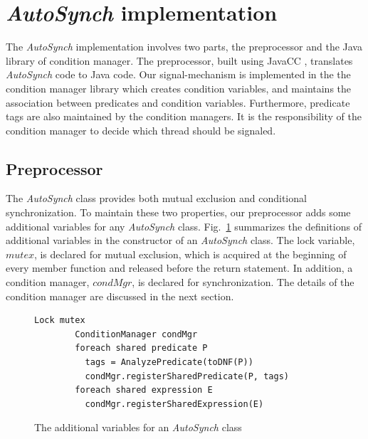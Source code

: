 \documentclass[preprint]{sigplanconf}
\begin{document}
\section{{\em AutoSynch} implementation} \label{sec:imp}
The {\em AutoSynch} implementation involves two parts, the preprocessor and the Java
library of condition manager. The preprocessor,  built using JavaCC
\cite{kod04}, translates  {\em AutoSynch} code to Java code. Our
signal-mechanism is implemented in the 
the condition manager library which creates condition variables, and maintains the association 
between predicates and condition variables. Furthermore, predicate tags are 
also maintained by the condition managers. It is the responsibility of the
condition manager to decide which thread should be signaled. 

\subsection{Preprocessor}
The {\em AutoSynch} class provides both mutual exclusion and conditional
synchronization. To maintain these two properties, our preprocessor adds some 
additional variables for any {\em AutoSynch} class. Fig.~\ref{fig:pre_cnst} 
summarizes the definitions of additional variables in the
constructor of an {\em AutoSynch} class. The lock 
variable, $mutex$, is declared for mutual exclusion, which is acquired at the 
beginning of every member function and released before the return statement.
In addition, a condition manager, $condMgr$, is declared for synchronization. 
The details of the condition manager are discussed in the next
section.  


\begin{figure}[ht!]
    \begin{Verbatim}[fontsize=\footnotesize,gobble=8,frame=lines,
            framesep=3mm]
        Lock mutex
        ConditionManager condMgr 
        foreach shared predicate P
          tags = AnalyzePredicate(toDNF(P))
          condMgr.registerSharedPredicate(P, tags)
        foreach shared expression E
          condMgr.registerSharedExpression(E)
    \end{Verbatim}
  \caption{The additional variables for an {\em AutoSynch} class}
  \label{fig:pre_cnst}
\end{figure}  
\end{document}
